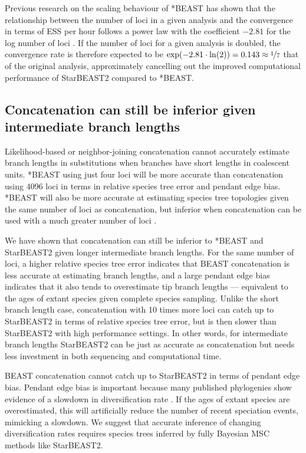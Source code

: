 \documentclass[12pt]{article}
\begin{document}
Previous research on the scaling behaviour of *BEAST has shown that the
relationship between the number of loci in a given analysis and the convergence
in terms of ESS per hour follows a power law with the coefficient $-2.81$ for
the log number of loci \citep{Ogilvie01052016}. If the number of loci for a
given analysis is doubled, the convergence rate is therefore
expected to be $\exp(-2.81 \cdot \ln(2)) = 0.143 \approx \nicefrac{1}{7}$ that
of the original analysis, approximately cancelling
out the improved computational performance of StarBEAST2 compared to *BEAST.

\subsection{Concatenation can still be inferior given intermediate branch lengths}

Likelihood-based or neighbor-joining concatenation cannot accurately
estimate branch lengths in substitutions when branches have short lengths in coalescent units.
*BEAST using just four loci will be more accurate than
concatenation using 4096 loci in terms in relative species tree error and
pendant edge bias. *BEAST will also be more accurate at estimating species tree
topologies given the same number of loci as concatenation, but inferior when
concatenation can be used with a much greater number of loci
\citep{Ogilvie01052016}.

We have shown that concatenation can still be inferior to *BEAST and StarBEAST2
given longer intermediate branch lengths. For the same number of loci, a higher
relative species tree error indicates that BEAST concatenation is less accurate at
estimating branch lengths, and a large pendant edge bias indicates that
it also tends to overestimate tip branch lengths --- equivalent to the
ages of extant species given complete species sampling. Unlike the short branch
length case, concatenation with 10 times more loci can catch up to StarBEAST2 in
terms of relative species tree error, but is then slower than StarBEAST2 with
high performance settings. In other words, for intermediate branch lengths
StarBEAST2 can be just as accurate as concatenation but needs less investment in
both sequencing and computational time.

BEAST concatenation cannot catch up to StarBEAST2 in terms of pendant edge bias.
Pendant edge bias is important because many published phylogenies show evidence
of a slowdown in diversification rate \citep{Moen2014190}. If the ages of extant
species are overestimated, this will artificially reduce the number of recent
speciation events, mimicking a slowdown. We suggest that accurate inference of
changing diversification rates requires species trees inferred by fully Bayesian MSC methods
like StarBEAST2.
\end{document}
